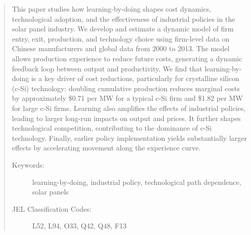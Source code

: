 \documentclass[12pt]{article}
\begin{document}
\begin{abstract}

\singlespacing 


This paper studies how learning-by-doing shapes cost dynamics, technological adoption, and the effectiveness of industrial policies in the solar panel industry. We develop and estimate a dynamic model of firm entry, exit, production, and technology choice using firm-level data on Chinese manufacturers and global data from 2000 to 2013. The model allows production experience to reduce future costs, generating a dynamic feedback loop between output and productivity.
We find that learning-by-doing is a key driver of cost reductions, particularly for crystalline silicon (c-Si) technology: doubling cumulative production reduces marginal costs by approximately \$0.71 per MW for a typical c-Si firm and \$1.82 per MW for large c-Si firms. Learning also amplifies the effects of industrial policies, leading to larger long-run impacts on output and prices. It further shapes technological competition, contributing to the dominance of c-Si technology. Finally, earlier policy implementation yields substantially larger effects by accelerating movement along the experience curve.

\thispagestyle{empty}

\begin{description}
\item[Keywords:] learning-by-doing, industrial policy, technological path dependence, solar panels 

\item[JEL Classification Codes:] %
L52, L94, O33, Q42, Q48, F13
\end{description}
\end{abstract}
\end{document}
